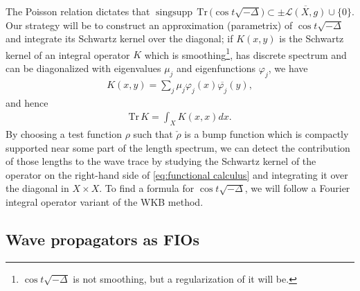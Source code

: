 \documentclass[11pt,letterpaper,oneside]{amsart}
\renewcommand{\phi}{\varphi}
\theoremstyle{definition}
\theoremstyle{remark}
\newcommand{\tr}{\text{Tr}\,}
\theoremstyle{definition}
\theoremstyle{remark}
\newcommand{\CL}{\mathcal{L}}
\DeclareMathOperator{\singsupp}{sing supp}
\begin{document}
\medskip

The Poisson relation dictates that $\singsupp \,\tr \big(\cos t \sqrt{-\Delta}\big) \subset \pm \overline{\CL(X, g)} \cup \{0\}$. Our strategy will be to construct an approximation (parametrix) of $\cos {t \sqrt{-\Delta}}$ and integrate its Schwartz kernel over the diagonal; if $K(x,y)$ is the Schwartz kernel of an integral operator $K$ which is smoothing\footnote{$\cos t \sqrt{-\Delta}$ is not smoothing, but a regularization of it will be.}, has discrete spectrum and can be diagonalized with eigenvalues $\mu_j$ and eigenfunctions $\phi_j$, we have
\begin{align}
    K(x,y) = \sum_j \mu_j \phi_j(x) \overline{\phi_j}(y),
\end{align}
and hence
\begin{align*}
    \tr K = \int_X K(x,x) dx.
\end{align*}
By choosing a test function $\rho$ such that $\check{\rho}$ is a bump function which is compactly supported near some part of the length spectrum, we can detect the contribution of those lengths to the wave trace by studying the Schwartz kernel of the operator on the right-hand side of \eqref{eq:functional calculus} and integrating it over the diagonal in $X \times X$. To find a formula for $\cos {t \sqrt{-\Delta}}$, we will follow a Fourier integral operator variant of the WKB method.




\subsection{Wave propagators as FIOs}
	
\end{document}
